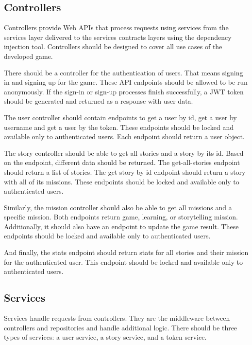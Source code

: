 \subsection{Controllers}

Controllers provide Web APIs that process requests using services from the services layer delivered to the services contracts layers using the dependency injection tool.
Controllers should be designed to cover all use cases of the developed game.

There should be a controller for the authentication of users.
That means signing in and signing up for the game.
These API endpoints should be allowed to be run anonymously.
If the sign-in or sign-up processes finish successfully, a JWT token should be generated and returned as a response with user data.

The user controller should contain endpoints to get a user by id, get a user by username and get a user by the token.
These endpoints should be locked and available only to authenticated users.
Each endpoint should return a user object.

The story controller should be able to get all stories and a story by its id.
Based on the endpoint, different data should be returned.
The get-all-stories endpoint should return a list of stories.
The get-story-by-id endpoint should return a story with all of its missions.
These endpoints should be locked and available only to authenticated users.

Similarly, the mission controller should also be able to get all missions and a specific mission.
Both endpoints return game, learning, or storytelling mission.
Additionally, it should also have an endpoint to update the game result.
These endpoints should be locked and available only to authenticated users.

And finally, the stats endpoint should return stats for all stories and their mission for the authenticated user.
This endpoint should be locked and available only to authenticated users.

\subsection{Services}

Services handle requests from controllers.
They are the middleware between controllers and repositories and handle additional logic.
There should be three types of services: a user service, a story service, and a token service.

